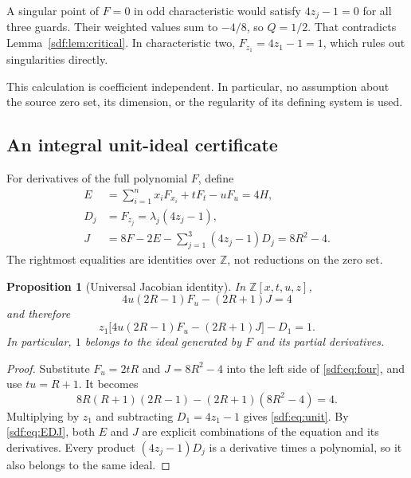 \documentclass[11pt,a4paper]{article}
\newtheorem{proposition}[theorem]{Proposition}
\theoremstyle{definition}
\theoremstyle{remark}
\newcommand{\Z}{\mathbb Z}
\begin{document}
A singular point of $F=0$ in odd characteristic would satisfy
$4z_j-1=0$ for all three guards. Their weighted values sum to $-4/8$, so
$Q=1/2$. That contradicts Lemma~\ref{sdf:lem:critical}. In characteristic two,
$F_{z_1}=4z_1-1=1$, which rules out singularities directly.

This calculation is coefficient independent. In particular, no assumption
about the source zero set, its dimension, or the regularity of its defining
system is used.

\subsection{An integral unit-ideal certificate}

For derivatives of the full polynomial $F$, define
\begin{equation}\label{sdf:eq:EDJ}
 \begin{split}
 E&=\sum_{i=1}^n x_iF_{x_i}+tF_t-uF_u=4H,\\
 D_j&=F_{z_j}=\lambda_j(4z_j-1),\\
 J&=8F-2E-\sum_{j=1}^3(4z_j-1)D_j=8R^2-4.
 \end{split}
\end{equation}
The rightmost equalities are identities over $\Z$, not reductions on the
zero set.

\begin{proposition}[Universal Jacobian identity]\label{sdf:prop:jacobian}
In $\Z[x,t,u,z]$,
\begin{equation}\label{sdf:eq:four}
 4u(2R-1)F_u-(2R+1)J=4
\end{equation}
and therefore
\begin{equation}\boxed{\displaystyle
 z_1\bigl[4u(2R-1)F_u-(2R+1)J\bigr]-D_1=1.}\label{sdf:eq:unit}
\end{equation}
In particular, $1$ belongs to the ideal generated by $F$ and its partial
derivatives.
\end{proposition}
\begin{proof}
Substitute $F_u=2tR$ and $J=8R^2-4$ into the left side of
\eqref{sdf:eq:four}, and use $tu=R+1$. It becomes
\[
 8R(R+1)(2R-1)-(2R+1)(8R^2-4)=4.
\]
Multiplying by $z_1$ and subtracting $D_1=4z_1-1$ gives
\eqref{sdf:eq:unit}. By \eqref{sdf:eq:EDJ}, both $E$ and $J$ are explicit
combinations of the equation and its derivatives. Every product $(4z_j-1)D_j$ is a derivative times a polynomial, so it
also belongs to the same ideal.
\end{proof}
\end{document}
